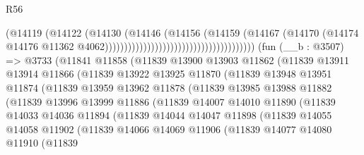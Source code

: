 \begin{lexlean}{R56}
\begin{coremodule}
                                                                (@14119
                                                                  (@14122
                                                                    (@14130
                                                                      (@14146
                                                                        (@14156
                                                                          (@14159
                                                                            (@14167
                                                                              (@14170
                                                                                (@14174
                                                                                  @14176
                                                                                  @11362
                                                                                  @4062)))))))))))))))))))))))))))))))))))))))
    (fun (__b : @3507) =>
    @3733
      (@11841
        @11858
        (@11839
          @13900
          @13903
          @11862
          (@11839
            @13911
            @13914
            @11866
            (@11839
              @13922
              @13925
              @11870
              (@11839
                @13948
                @13951
                @11874
                (@11839
                  @13959
                  @13962
                  @11878
                  (@11839
                    @13985
                    @13988
                    @11882
                    (@11839
                      @13996
                      @13999
                      @11886
                      (@11839
                        @14007
                        @14010
                        @11890
                        (@11839
                          @14033
                          @14036
                          @11894
                          (@11839
                            @14044
                            @14047
                            @11898
                            (@11839
                              @14055
                              @14058
                              @11902
                              (@11839
                                @14066
                                @14069
                                @11906
                                (@11839
                                  @14077
                                  @14080
                                  @11910
                                  (@11839

\end{coremodule}
\end{lexlean}
